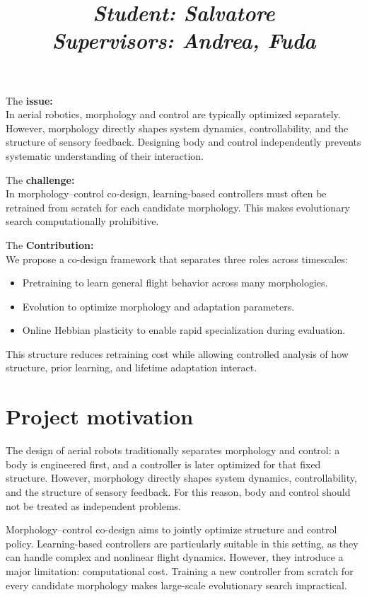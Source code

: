\documentclass[letterpaper,10pt]{article}
\title{\vspace{-2.0cm}\Large \textbf{\mytitle{}}
\medskip \medskip \normalsize
\textit{Student: Salvatore}\\
\textit{Supervisors: Andrea, Fuda}
\vspace{-1.5cm}
}
\author{}
\date{}
\begin{document}
\maketitle

\begin{boxH}
The \textbf{issue:}\\
In aerial robotics, morphology and control are typically optimized separately. However, morphology directly shapes system dynamics, controllability, and the structure of sensory feedback. Designing body and control independently prevents systematic understanding of their interaction.

The \textbf{challenge:}\\
In morphology--control co-design, learning-based controllers must often be retrained from scratch for each candidate morphology. This makes evolutionary search computationally prohibitive.

The \textbf{Contribution:}\\
We propose a co-design framework that separates three roles across timescales:
\begin{itemize}
    \item Pretraining to learn general flight behavior across many morphologies.
    \item Evolution to optimize morphology and adaptation parameters.
    \item Online Hebbian plasticity to enable rapid specialization during evaluation.
\end{itemize}
This structure reduces retraining cost while allowing controlled analysis of how structure, prior learning, and lifetime adaptation interact.
\end{boxH}

\section{Project motivation}

The design of aerial robots traditionally separates morphology and control: a body is engineered first, and a controller is later optimized for that fixed structure. However, morphology directly shapes system dynamics, controllability, and the structure of sensory feedback. For this reason, body and control should not be treated as independent problems.

Morphology--control co-design aims to jointly optimize structure and control policy. Learning-based controllers are particularly suitable in this setting, as they can handle complex and nonlinear flight dynamics. However, they introduce a major limitation: computational cost. Training a new controller from scratch for every candidate morphology makes large-scale evolutionary search impractical.
\end{document}
